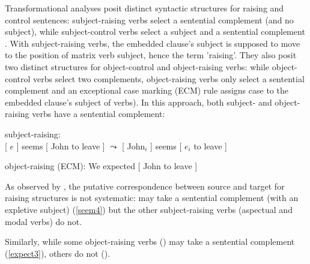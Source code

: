 \documentclass[output=paper
	        ,collection
	        ,collectionchapter
 	        ,biblatex
                ,babelshorthands
                ,newtxmath
                ,draftmode
                ,colorlinks, citecolor=brown
]{langscibook}
\begin{document}
Transformational analyses posit distinct syntactic structures for raising and control sentences: subject-raising verbs select a sentential complement (and no subject), while subject-control verbs select a subject and a sentential complement \citep{Postal1974, Chomsky81a}. With subject-raising verbs, the embedded clause's subject is supposed to move to the position of matrix verb subject, hence the  term 'raising'. They also posit two distinct structures for object-control and object-raising verbs: while object-control verbs select two complements, object-raising verbs only select a sentential complement and
an exceptional case marking (ECM) rule assigns case to the embedded clause's subject of  verbs).
In this approach, both subject- and object-raising verbs have a sentential complement:
	
\begin{exe}
\ex  \begin{xlist}
\ex 	subject-raising:\\
{}[ $e$ ] seems [ John to leave ] 
$\leadsto$  
{}[ John$_{i}$ ] seems [ $e_{i}$ to leave ]	

\ex 	object-raising (ECM): We expected [ John to leave ] 	
 \end{xlist}
 \end{exe}

 As observed by  \citet{PollardandSag1994}, the putative correspondence between source and target for raising structures is not systematic:  may take a sentential complement (with an expletive subject) (\ref{seem4}) but the other subject-raising verbs (aspectual and modal verbs) do not. 


\eal
{}
\zl
 
Similarly, while some object-raising verbs () may take a sentential complement (\ref{expect3}), others do not ().
 
\end{document}
